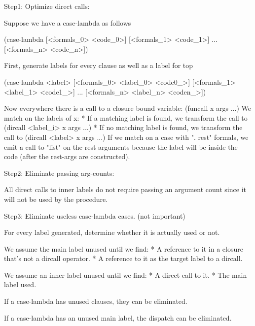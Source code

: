 
Step1: Optimize direct calls:

Suppose we have a case-lambda as follows

(case-lambda
  [<formals_0> <code_0>]
  [<formals_1> <code_1>]
  ...
  [<formals_n> <code_n>])

First, generate labels for every clause as well as a label for top

(case-lambda <label>
  [<formals_0> <label_0> <code0_>]
  [<formals_1> <label_1> <code1_>]
  ...
  [<formals_n> <label_n> <coden_>])

Now everywhere there is a call to a closure bound variable:
  (funcall x args ...)
We match on the labels of x:
  * If a matching label is found, we transform the call to
    (dircall <label_i> x args ...)
  * If no matching label is found, we transform the call to
    (dircall <label> x args ...)
If we match on a case with ". rest" formals, we emit a call
to "list" on the rest arguments because the label will be
inside the code (after the rest-args are constructed).


Step2: Eliminate passing arg-counts:

All direct calls to inner labels do not require passing an argument
count since it will not be used by the procedure.



Step3:  Eliminate useless case-lambda cases. (not important)

For every label generated, determine whether it is actually used or
not.  

We assume the main label unused until we find:
  * A reference to it in a closure that's not a dircall operator.
  * A reference to it as the target label to a dircall.

We assume an inner label unused until we find:
  * A direct call to it.
  * The main label used.

If a case-lambda has unused clauses, they can be eliminated.

If a case-lambda has an unused main label, the dispatch can be
eliminated.



